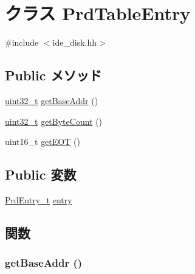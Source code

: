 \hypertarget{classPrdTableEntry}{
\section{クラス PrdTableEntry}
\label{classPrdTableEntry}
}


{\ttfamily \#include $<$ide\_\-disk.hh$>$}\subsection*{Public メソッド}
\begin{DoxyCompactItemize}
\item 
\hyperlink{Type_8hh_a435d1572bf3f880d55459d9805097f62}{uint32\_\-t} \hyperlink{classPrdTableEntry_ad5094152459cac71546bdbd2a88a06e1}{getBaseAddr} ()
\item 
\hyperlink{Type_8hh_a435d1572bf3f880d55459d9805097f62}{uint32\_\-t} \hyperlink{classPrdTableEntry_aeb2b8df06bf82475ef82d84c80a61813}{getByteCount} ()
\item 
uint16\_\-t \hyperlink{classPrdTableEntry_a15470a9b6762e3776b9cd784a74421c4}{getEOT} ()
\end{DoxyCompactItemize}
\subsection*{Public 変数}
\begin{DoxyCompactItemize}
\item 
\hyperlink{structPrdEntry}{PrdEntry\_\-t} \hyperlink{classPrdTableEntry_a367da4f281ab033aae067ee206649f04}{entry}
\end{DoxyCompactItemize}


\subsection{関数}
\hypertarget{classPrdTableEntry_ad5094152459cac71546bdbd2a88a06e1}{
\subsubsection[{getBaseAddr}]{ getBaseAddr ()}}
\label{classPrdTableEntry_ad5094152459cac71546bdbd2a88a06e1}



